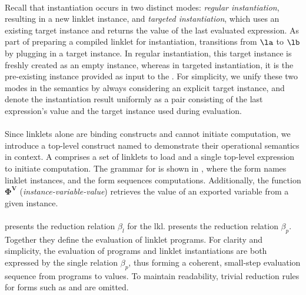 		\paragraph{}%
			Recall that instantiation occurs in two distinct modes: \emph{regular instantiation}, resulting in a new linklet instance, and \emph{targeted instantiation}, which uses an existing target instance and returns the value of the last evaluated expression. As part of preparing a compiled linklet for instantiation,  transitions from $\la$ to $\lb$ by plugging in a target instance. In regular instantiation, this target instance is freshly created as an empty instance, whereas in targeted instantiation, it is the pre-existing instance provided as input to the . For simplicity, we unify these two modes in the semantics by always considering an explicit target instance, and denote the instantiation result uniformly as a pair consisting of the last expression's value and the target instance used during evaluation.


		\paragraph{}%
			Since linklets alone are binding constructs and cannot initiate computation, we introduce a top-level construct named  to demonstrate their operational semantics in context. A  comprises a set of linklets to load and a single top-level expression to initiate computation. The grammar for  is shown in , where the  form names linklet instances, and the  form sequences computations. Additionally, the function $\bm{\Phi^V}$ (\emph{instance-variable-value}) retrieves the value of an exported variable from a given instance.



		\paragraph{}%
			 presents the reduction relation $\beta_l$ for the \gls{lkl}.  presents the reduction relation $\beta_p$. Together they define the evaluation of linklet programs. For clarity and simplicity, the evaluation of programs and linklet instantiations are both expressed by the single relation $\beta_p$, thus forming a coherent, small-step evaluation sequence from programs to values. To maintain readability, trivial reduction rules for forms such as  and  are omitted.

